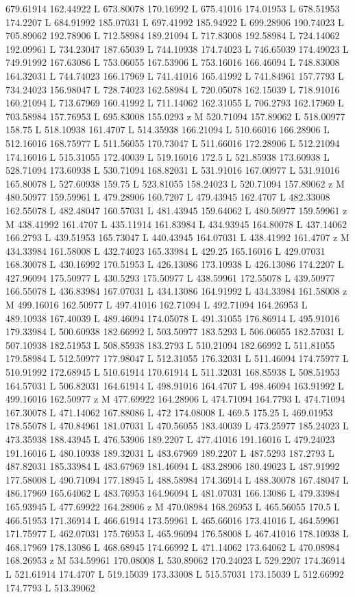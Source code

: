 {\begin{scope}[local bounding box=bb]
{679.61914 162.44922 L 673.80078 170.16992 L 675.41016 174.01953 L 678.51953 174.2207 L 684.91992 185.07031 L 697.41992 185.94922 L 699.28906 190.74023 L 705.89062 192.78906 L 712.58984 189.21094 L 717.83008 192.58984 L 724.14062 192.09961 L 734.23047 187.65039 L 744.10938 174.74023 L 746.65039 174.49023 L 749.91992 167.63086 L 753.06055 167.53906 L 753.16016 166.46094 L 748.83008 164.32031 L 744.74023 166.17969 L 741.41016 165.41992 L 741.84961 157.7793 L 734.24023 156.98047 L 728.74023 162.58984 L 720.05078 162.15039 L 718.91016 160.21094 L 713.67969 160.41992 L 711.14062 162.31055 L 706.2793 162.17969 L 703.58984 157.76953 L 695.83008 155.0293 z M 520.71094 157.89062 L 518.00977 158.75 L 518.10938 161.4707 L 514.35938 166.21094 L 510.66016 166.28906 L 512.16016 168.75977 L 511.56055 170.73047 L 511.66016 172.28906 L 512.21094 174.16016 L 515.31055 172.40039 L 519.16016 172.5 L 521.85938 173.60938 L 528.71094 173.60938 L 530.71094 168.82031 L 531.91016 167.00977 L 531.91016 165.80078 L 527.60938 159.75 L 523.81055 158.24023 L 520.71094 157.89062 z M 480.50977 159.59961 L 479.28906 160.7207 L 479.43945 162.4707 L 482.33008 162.55078 L 482.48047 160.57031 L 481.43945 159.64062 L 480.50977 159.59961 z M 438.41992 161.4707 L 435.11914 161.83984 L 434.93945 164.80078 L 437.14062 166.2793 L 439.51953 165.73047 L 440.43945 164.07031 L 438.41992 161.4707 z M 434.33984 161.58008 L 432.74023 165.33984 L 429.25 165.16016 L 429.07031 168.30078 L 430.16992 170.51953 L 426.13086 173.10938 L 426.13086 174.2207 L 427.96094 175.50977 L 430.5293 175.50977 L 438.59961 172.55078 L 439.50977 166.55078 L 436.83984 167.07031 L 434.13086 164.91992 L 434.33984 161.58008 z M 499.16016 162.50977 L 497.41016 162.71094 L 492.71094 164.26953 L 489.10938 167.40039 L 489.46094 174.05078 L 491.31055 176.86914 L 495.91016 179.33984 L 500.60938 182.66992 L 503.50977 183.5293 L 506.06055 182.57031 L 507.10938 182.51953 L 508.85938 183.2793 L 510.21094 182.66992 L 511.81055 179.58984 L 512.50977 177.98047 L 512.31055 176.32031 L 511.46094 174.75977 L 510.91992 172.68945 L 510.61914 170.61914 L 511.32031 168.85938 L 508.51953 164.57031 L 506.82031 164.61914 L 498.91016 164.4707 L 498.46094 163.91992 L 499.16016 162.50977 z M 477.69922 164.28906 L 474.71094 164.7793 L 474.71094 167.30078 L 471.14062 167.88086 L 472 174.08008 L 469.5 175.25 L 469.01953 178.55078 L 470.84961 181.07031 L 470.56055 183.40039 L 473.25977 185.24023 L 473.35938 188.43945 L 476.53906 189.2207 L 477.41016 191.16016 L 479.24023 191.16016 L 480.10938 189.32031 L 483.67969 189.2207 L 487.5293 187.2793 L 487.82031 185.33984 L 483.67969 181.46094 L 483.28906 180.49023 L 487.91992 177.58008 L 490.71094 177.18945 L 488.58984 174.36914 L 488.30078 167.48047 L 486.17969 165.64062 L 483.76953 164.96094 L 481.07031 166.13086 L 479.33984 165.93945 L 477.69922 164.28906 z M 470.08984 168.26953 L 465.56055 170.5 L 466.51953 171.36914 L 466.61914 173.59961 L 465.66016 173.41016 L 464.59961 171.75977 L 462.07031 175.76953 L 465.96094 176.58008 L 467.41016 178.10938 L 468.17969 178.13086 L 468.68945 174.66992 L 471.14062 173.64062 L 470.08984 168.26953 z M 534.59961 170.08008 L 530.89062 170.24023 L 529.2207 174.36914 L 521.61914 174.4707 L 519.15039 173.33008 L 515.57031 173.15039 L 512.66992 174.7793 L 513.39062 }
\end{scope}}
